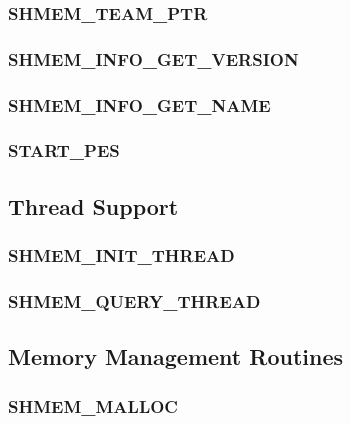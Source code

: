 \documentclass[10pt,oneside]{book}
\begin{document}
\subsubsection{\textbf{SHMEM\_TEAM\_PTR}}\label{subsec:shmem_team_ptr}


\subsubsection{\textbf{SHMEM\_INFO\_GET\_VERSION}}\label{subsec:shmem_info_get_version}


\subsubsection{\textbf{SHMEM\_INFO\_GET\_NAME}}\label{subsec:shmem_info_get_name}


\subsubsection{\textbf{START\_PES}}\label{subsec:start_pes}


\subsection{Thread Support}
\label{subsec:thread_support}


\subsubsection{\textbf{SHMEM\_INIT\_THREAD}}
\label{subsec:shmem_init_thread}


\subsubsection{\textbf{SHMEM\_QUERY\_THREAD}}
\label{subsec:shmem_query_thread}



\subsection{Memory Management Routines}
\label{sec:memory_management}


\subsubsection{\textbf{SHMEM\_MALLOC}}\label{subsec:shmem_malloc}

\end{document}
